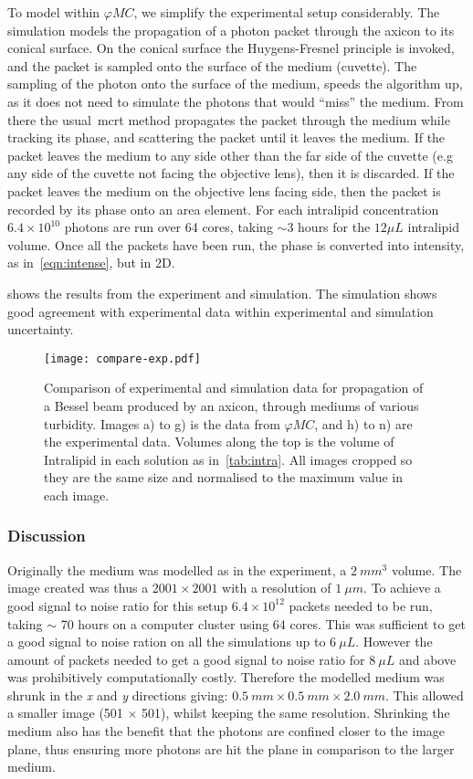 To model within $\varphi MC$, we simplify the experimental setup considerably.
The simulation models the propagation of a photon packet through the axicon to its conical surface. 
On the conical surface the Huygens-Fresnel principle is invoked, and the packet is sampled onto the surface of the medium (cuvette).
The sampling of the photon onto the surface of the medium, speeds the algorithm up, as it does not need to simulate the photons that would ``miss'' the medium.
From there the usual~\gls*{mcrt} method propagates the packet through the medium while tracking its phase, and scattering the packet until it leaves the medium.
If the packet leaves the medium to any side other than the far side of the cuvette (e.g any side of the cuvette not facing the objective lens), then it is discarded.
If the packet leaves the medium on the objective lens facing side, then the packet is recorded by its phase onto an area element.
For each intralipid concentration $6.4\times10^{10}$ photons are run over 64 cores, taking $\sim 3$ hours for the $12\mu L$ intralipid volume.
Once all the packets have been run, the phase is converted into intensity, as in~\cref{eqn:intense}, but in 2D.

 shows the results from the experiment and simulation. The simulation shows good agreement with experimental data within experimental and simulation uncertainty.

\begin{figure}[!ht]
\centering
\texttt{[image: compare-exp.pdf]}
\caption{Comparison of experimental and simulation data for propagation of a Bessel beam produced by an axicon, through mediums of various turbidity. Images a) to g) is the data from $\varphi MC$, and h) to n) are the experimental data. Volumes along the top is the volume of Intralipid in each solution as in~\cref{tab:intra}. All images cropped so they are the same size and normalised to the maximum value in each image.}
\label{fig:compareexpbessel}
\end{figure}

\subsubsection*{Discussion}

Originally the medium was modelled as in the experiment, a $2~mm^3$ volume.
The image created was thus a $2001 \times 2001$ with a resolution of $1~\mu m$.
To achieve a good signal to noise ratio for this setup $6.4\times10^{12}$ packets needed to be run, taking $\sim$ 70 hours on a computer cluster using 64 cores.
This was sufficient to get a good signal to noise ration on all the simulations up to $6~\mu L$.
However the amount of packets needed to get a good signal to noise ratio for $8~\mu L$ and above was prohibitively computationally costly.
Therefore the modelled medium was shrunk in the \textit{x} and \textit{y} directions giving: $0.5~mm \times 0.5~mm \times 2.0~mm$.
This allowed a smaller image (501 $\times$ 501), whilst keeping the same resolution.
Shrinking the medium also has the benefit that the photons are confined closer to the image plane, thus ensuring more photons are hit the plane in comparison to the larger medium. 

